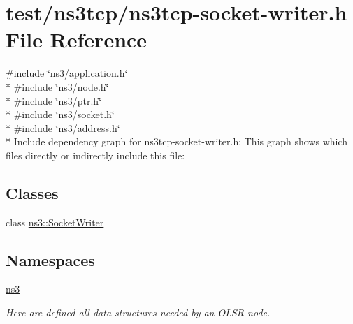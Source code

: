 \hypertarget{ns3tcp-socket-writer_8h}{}\section{test/ns3tcp/ns3tcp-\/socket-\/writer.h File Reference}
\label{ns3tcp-socket-writer_8h}
{\ttfamily \#include \char`\"{}ns3/application.\+h\char`\"{}}\\*
{\ttfamily \#include \char`\"{}ns3/node.\+h\char`\"{}}\\*
{\ttfamily \#include \char`\"{}ns3/ptr.\+h\char`\"{}}\\*
{\ttfamily \#include \char`\"{}ns3/socket.\+h\char`\"{}}\\*
{\ttfamily \#include \char`\"{}ns3/address.\+h\char`\"{}}\\*
Include dependency graph for ns3tcp-\/socket-\/writer.h\+:
This graph shows which files directly or indirectly include this file\+:
\subsection*{Classes}
\begin{DoxyCompactItemize}
\item 
class \hyperlink{classns3_1_1SocketWriter}{ns3\+::\+Socket\+Writer}
\end{DoxyCompactItemize}
\subsection*{Namespaces}
\begin{DoxyCompactItemize}
\item 
 \hyperlink{namespacens3}{ns3}
\begin{DoxyCompactList}\small\item\em Here are defined all data structures needed by an O\+L\+SR node. \end{DoxyCompactList}\end{DoxyCompactItemize}
